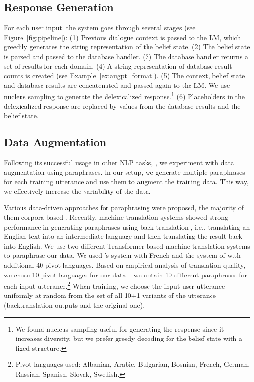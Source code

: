 \documentclass[11pt]{article}
\newcommand{\exampleref}[1]{Example~\ref{#1}}
\begin{document}
\subsection{Response Generation}
For each user input, the system goes through several stages (see Figure~\ref{fig:pipeline}):
(1) Previous dialogue context is passed to the LM, which greedily generates the string representation of the belief state. (2) The belief state is parsed and passed to the database handler. (3) The database handler  returns a set of results for each domain. (4) A string representation of database result counts is created 
(see \exampleref{ex:augpt_format}). (5) The context, belief state and database results are concatenated and passed again to the LM. We use nucleus sampling \cite{holtzman2019} to generate the delexicalized response.\footnote{We found nucleus sampling useful for generating the response since it increases diversity, but we prefer greedy decoding for the belief state with a fixed structure.} (6) Placeholders in the delexicalized response are replaced by values from the database results and the belief state. 

\subsection{Data Augmentation}
Following its successful usage in other NLP tasks, \cite{konstas_neural_2017,elder_shape_2020}, we experiment with data augmentation using paraphrases.
In our setup, we generate multiple paraphrases for each training utterance and use them to augment the training data.
This way, we effectively increase the variability of the data.

Various data-driven approaches for paraphrasing were proposed, the majority of them corpora-based \cite{madnani2010generating}.
Recently, machine translation systems showed strong performance in generating paraphrases using back-translation \cite{sennrich2016,edunov2018,federmann2019multilingual}, i.e., translating an English text into an intermediate language and then translating the result back into English.
We use two different Transformer-based machine translation systems to paraphrase our data.
We used \citet{edunov2018}'s system with French and the system of \citet{machavcek2020elitr,DBLP:journals/corr/abs-2104-05688} with additional 40 pivot languages.
Based on empirical analysis of translation quality, we chose 10 pivot languages for our data -- we obtain 10 different paraphrases for each input utterance.\footnote{Pivot languages used:  Albanian, Arabic, Bulgarian, Bosnian, French, German, Russian, Spanish, Slovak, Swedish.}
When training, we choose the input user utterance uniformly at random from the set of all 10+1 variants of the utterance (backtranslation outputs and the original one).
\end{document}

